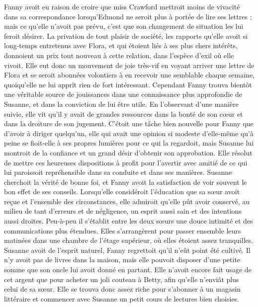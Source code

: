 Fanny avoit eu raison de croire que miss Crawford mettroit moins de vivacité dans sa correspondance lorsqu'Edmond ne seroit plus à portée de lire ses lettres ; mais ce qu'elle n'avoit pas prévu, c'est que son changement de situation les lui feroit désirer. La privation de tout plaisir de société, les rapports qu'elle avoit si long-temps entretenus avec Flora, et qui étoient liés à ses plus chers intérêts, donnoient un prix tout nouveau à cette relation, dans l'espèce d'exil où elle vivoit. Elle eut donc un mouvement de joie très-vif en voyant arriver une lettre de Flora et se seroit\setcounter{page}{400} abonnées volontiers à en recevoir une semblable chaque semaine, quoiqu'elle ne lui apprît rien de fort intéressant.
Cependant Fanny trouva bientôt une véritable source de jouissances dans une connaissance plus approfondie de Susanne, et dans la conviction de lui être utile. En l'observant d'une manière suivie, elle vit qu'il y avait de grandes ressources dans la bonté de son cœur et dans la droiture de son jugement.
C'étoit une tâche bien nouvelle pour Fanny que d'avoir à diriger quelqu'un, elle qui avait une opinion si modeste d'elle-même qu'à peine se fioit-elle à ses propres lumières pour ce qui la regardoit, mais Susanne lui montroit de la confiance et un grand désir d'obtenir son approbation. Elle résolut de mettre ces heureuses dispositions à profit pour l'avertir avec amitié de ce qui lui paroissoit repréhensible dans sa conduite et dans ses manières. Susanne cherchoit la vérité de bonne foi, et Fanny avoit la satisfaction de voir souvent le bon effet de ses conseils. Lorsqu'elle considéroit l'éducation que sa sœur avoit reçue et l'ensemble des circonstances, elle admiroit qu'elle pût avoir conservé, au milieu de tant d'erreurs et de négligence, un esprit aussi sain et des intentions aussi droites.\setcounter{page}{401} Peu-à-peu il s'établit entre les deux sœurs une douce intimité et des communications plus étendues. Elles s'arrangèrent pour passer ensemble leurs matinées dans une chambre de l'étage supérieur, où elles étoient assez tranquilles. Susanne avoit de l'esprit naturel, Fanny regrettoit qu'il n'eût point été cultivé. Il n'y avoit pas de livres dans la maison, mais elle pouvoit disposer d'une petite somme que son oncle lui avoit donné en partant. Elle n'avoit encore fait usage de cet argent que pour acheter un joli couteau à Betty, afin qu'elle n'enviât plus celui de sa sœur. Elle se trouva donc assez riche pour s'abonner à un magasin littéraire et commencer avec Susanne un petit cours de lectures bien choisies.
